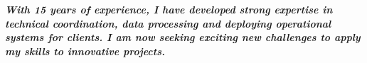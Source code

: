 \documentclass[10pt,a4paper,ragged2e,withhyper]{altacv}
\begin{document}

\makecvheader

\divider

\textbf{\textit{
With 15 years of experience, I have developed strong expertise in technical coordination, data processing and deploying operational systems for clients. I am now seeking exciting new challenges to apply my skills to innovative projects.
}}
\medskip


\end{document}
